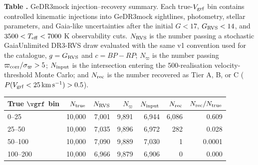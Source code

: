 \begin{center}
\label{tab:recovery_summary}
\begin{minipage}{\columnwidth}
\small\textbf{Table \thetable.} GeDR3mock injection--recovery summary.  Each true-$V_{\rm grf}$ bin contains controlled kinematic injections into GeDR3mock sightlines, photometry, stellar parameters, and Gaia-like uncertainties after the initial $G<17$, $G_{\rm RVS}<14$, and $3500<T_{\rm eff}<7000$ K observability cuts.  $N_{\rm RVS}$ is the number passing a stochastic GaiaUnlimited DR3-RVS draw evaluated with the same v1 convention used for the catalogue, $g=G_{\rm RVS}$ and $c=BP{-}RP$; $N_{\varpi}$ is the number passing $\varpi_{\rm corr}/\sigma_\varpi>5$; $N_{\rm input}$ is the intersection entering the 500-realisation velocity-threshold Monte Carlo; and $N_{\rm rec}$ is the number recovered as Tier A, B, or C ($P(V_{\rm grf}<25\,{\rm km\,s^{-1}})>0.5$).
\end{minipage}
\vspace{0.4ex}

\footnotesize
\setlength{\tabcolsep}{1pt}
\begin{tabular}{@{}lrrrrrr@{}}
\hline\hline
True $\vgrf$ bin & $N_{\rm true}$ & $N_{\rm RVS}$ & $N_{\varpi}$ & $N_{\rm input}$ & $N_{\rm rec}$ & $N_{\rm rec}/N_{\rm true}$ \\
\hline
0--25 & 10,000 & 7,001 & 9,891 & 6,944 & 6,086 & 0.609 \\
25--50 & 10,000 & 7,035 & 9,896 & 6,972 & 282 & 0.028 \\
50--100 & 10,000 & 7,090 & 9,889 & 7,030 & 1 & 0.0001 \\
100--200 & 10,000 & 6,966 & 9,879 & 6,906 & 0 & 0.000 \\
\hline
\end{tabular}
\end{center}
